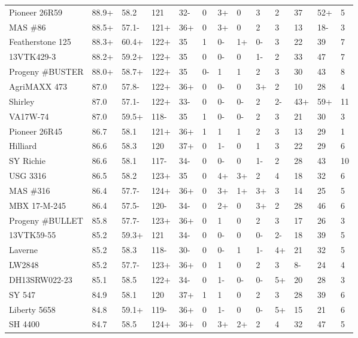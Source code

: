 \documentclass[12pt, letterpaper]{article}
\begin{document}
\begin{landscape}
\begin{ThreePartTable}
\begin{longtable}{lllllllllllll}
  Pioneer 26R59 & 88.9+ & 58.2 & 121 & 32- & 0 & 3+ & 0 & 3 & 2 & 37 & 52+ & 5 \\ 
  MAS \#86 & 88.5+ & 57.1- & 121+ & 36+ & 0 & 3+ & 0 & 2 & 3 & 13 & 18- & 3 \\ 
  Featherstone 125 & 88.3+ & 60.4+ & 122+ & 35 & 1 & 0- & 1+ & 0- & 3 & 22 & 39 & 7 \\ 
  13VTK429-3 & 88.2+ & 59.2+ & 122+ & 35 & 0 & 0- & 0 & 1- & 2 & 33 & 47 & 7 \\ 
  Progeny \#BUSTER & 88.0+ & 58.7+ & 122+ & 35 & 0- & 1 & 1 & 2 & 3 & 30 & 43 & 8 \\ 
  AgriMAXX 473 & 87.0 & 57.8- & 122+ & 36+ & 0 & 0- & 0 & 3+ & 2 & 10 & 28 & 4 \\ 
  Shirley & 87.0 & 57.1- & 122+ & 33- & 0 & 0- & 0- & 2 & 2- & 43+ & 59+ & 11 \\ 
  VA17W-74 & 87.0 & 59.5+ & 118- & 35 & 1 & 0- & 0- & 2 & 3 & 21 & 30 & 3 \\ 
  Pioneer 26R45 & 86.7 & 58.1 & 121+ & 36+ & 1 & 1 & 1 & 2 & 3 & 13 & 29 & 1 \\ 
  Hilliard & 86.6 & 58.3 & 120 & 37+ & 0 & 1- & 0 & 1 & 3 & 22 & 29 & 6 \\ 
  SY Richie & 86.6 & 58.1 & 117- & 34- & 0 & 0- & 0 & 1- & 2 & 28 & 43 & 10 \\ 
  USG 3316 & 86.5 & 58.2 & 123+ & 35 & 0 & 4+ & 3+ & 2 & 4 & 18 & 32 & 6 \\ 
  MAS \#316 & 86.4 & 57.7- & 124+ & 36+ & 0 & 3+ & 1+ & 3+ & 3 & 14 & 25 & 5 \\ 
  MBX 17-M-245 & 86.4 & 57.5- & 120- & 34- & 0 & 2+ & 0 & 3+ & 2 & 28 & 46 & 6 \\ 
  Progeny \#BULLET & 85.8 & 57.7- & 123+ & 36+ & 0 & 1 & 0 & 2 & 3 & 17 & 26 & 3 \\ 
  13VTK59-55 & 85.2 & 59.3+ & 121 & 34- & 0 & 0- & 0 & 0- & 2- & 18 & 39 & 5 \\ 
  Laverne & 85.2 & 58.3 & 118- & 30- & 0 & 0- & 1 & 1- & 4+ & 21 & 32 & 5 \\ 
  LW2848 & 85.2 & 57.7- & 123+ & 36+ & 0 & 1 & 0 & 2 & 3 & 8- & 24 & 4 \\ 
  DH13SRW022-23 & 85.1 & 58.5 & 122+ & 34- & 0 & 1- & 0- & 0- & 5+ & 20 & 28 & 3 \\ 
  SY 547 & 84.9 & 58.1 & 120 & 37+ & 1 & 1 & 0 & 2 & 3 & 28 & 39 & 6 \\ 
  Liberty 5658 & 84.8 & 59.1+ & 119- & 36+ & 0 & 1- & 0 & 0- & 5+ & 15 & 21 & 6 \\ 
  SH 4400 & 84.7 & 58.5 & 124+ & 36+ & 0 & 3+ & 2+ & 2 & 4 & 32 & 47 & 5 \\ 

\end{longtable}
\end{ThreePartTable}
\end{landscape}
\end{document}
